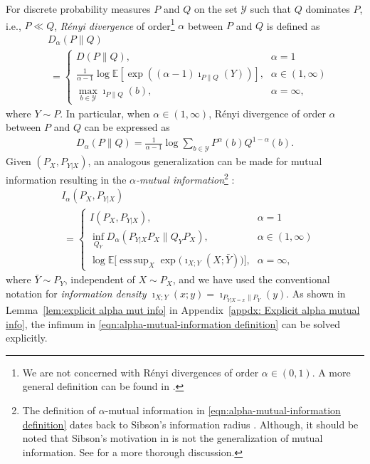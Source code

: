\documentclass[journal, 10pt]{IEEEtran}
\def\ds{\displaystyle}
\newcommand{\bbE}{\mathbb{E}}
\newcommand{\cY}{\mathcal{Y}}
\theoremstyle{plain}
\theoremstyle{plain}
\theoremstyle{plain}
\theoremstyle{plain}
\DeclareMathOperator*{\esssup}{ess\,sup}
\begin{document}
For discrete probability measures $P$ and $Q$ on the set $\cY $ such that $Q$ dominates $P$, i.e., $P \ll Q $, \emph{R\'enyi divergence} of order\footnote{We are not concerned with R\'enyi divergences of order $\alpha\in (0,1) $. A more general definition can be found in \cite{Erven2014}.} $\alpha $ between $P$ and $Q$ is defined as
\begin{align}
	&D_{\alpha}(P\|Q) \nonumber \\
	&\ =
	\begin{cases}
	 D(P\|Q)\text{,}  &  \alpha =1 \\
	\frac{1}{\alpha-1}\log \bbE[ \exp( (\alpha-1) \imath_{P\|Q}(Y))]\text{,} &  \alpha \in (1,\infty) \\
		\ds\max_{b\in \cY } \imath_{P\|Q}(b)\text{,} & \alpha =\infty\text{,}
	\end{cases} \label{eqn:renyi divergence definition}
\end{align}
where $Y\sim P $. In particular, when $\alpha\in (1,\infty)$, R\'enyi divergence of order $\alpha$ between $P$ and $Q$ can be expressed as
\begin{align}
	D_{\alpha}(P\|Q)=\frac{1}{\alpha-1}\log\sum_{b\in \cY} P^\alpha(b) Q^{1-\alpha}(b)\text{.}
\end{align}
Given $(P_X, P_{Y|X})$, an analogous generalization can be made for mutual information resulting in the \emph{$\alpha$-mutual information}\footnote{The definition of $\alpha$-mutual information in \eqref{eqn:alpha-mutual-information definition} dates back to Sibson's information radius \cite{sibson1969information}. Although, it should be noted that Sibson's motivation in \cite{sibson1969information} is not the generalization of mutual information. See \cite{Verdu2015} for a more thorough discussion.} \cite{Verdu2015}:
\begin{align}
	& I_{\alpha}(P_X, P_{Y|X}) \nonumber \\ 
	&\ =
	\begin{cases}
	I(P_X, P_{Y|X})\text{,} &  \alpha=1 \\
	\ds\inf_{Q_Y} D_{\alpha} (P_{Y|X}P_X \| Q_Y P_X)\text{,} &  \alpha\in (1,\infty)   \\
	\ds\log\bbE\bigg[\esssup_{X} \exp\big(   \imath_{X; Y }(X;\bar{Y}) \big) \bigg]\text{,} &  \alpha=\infty\text{,}  
	\end{cases} \label{eqn:alpha-mutual-information definition} 
\end{align}
where $\bar{Y}\sim P_Y $, independent of $X\sim P_X $, and we have used the conventional notation for \emph{information density} $\imath_{X;Y}(x;y)=\imath_{P_{Y|X=x}\|P_{Y} }(y) $. As shown in Lemma~\ref{lem:explicit alpha mut info} in Appendix~\ref{appdx: Explicit alpha mutual info}, the infimum in \eqref{eqn:alpha-mutual-information definition} can be solved explicitly. 
\end{document}
